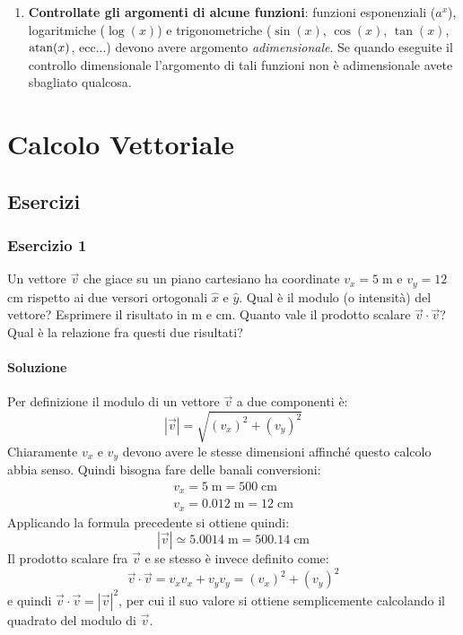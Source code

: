 \documentclass[12pt,a4paper]{book}
\begin{document}
\begin{enumerate}
\item \textbf{Controllate gli argomenti di alcune funzioni}: funzioni esponenziali ($a^x$), logaritmiche ($\log(x)$) e trigonometriche ($\sin(x)$, $\cos(x)$, $\tan(x)$, $\atan(x)$, ecc...) devono avere argomento \textit{adimensionale}. Se quando eseguite il controllo dimensionale l'argomento di tali funzioni non è adimensionale avete sbagliato qualcosa.
\end{enumerate}

\tableofcontents
\thispagestyle{empty}
\newpage

\mainmatter

\chapter{Calcolo Vettoriale}
\section{Esercizi}
\subsection*{Esercizio 1}
Un vettore $\vec{v}$ che giace su un piano cartesiano ha 
coordinate $v_x=5 \;$m e $v_y=12 \;$cm rispetto ai due versori ortogonali $\hat{x}$ e $\hat{y}$. Qual è il modulo (o intensità) del vettore? Esprimere il risultato in m e cm. Quanto vale il prodotto scalare $\vec{v} \cdot \vec{v}$? Qual è la relazione fra questi due risultati?
\subsubsection*{Soluzione}
Per definizione il modulo di un vettore $\vec{v}$ a due componenti è:
\begin{equation*}
|\vec{v}|=\sqrt{(v_x)^2+(v_y)^2}
\end{equation*}
Chiaramente $v_x$ e $v_y$ devono avere le stesse dimensioni 
affinché questo calcolo abbia senso. Quindi bisogna fare delle banali conversioni:
\begin{gather*}
v_x=5 \; \text{m}= 500 \; \text{cm}\\
v_x=0.012 \; \text{m}= 12 \; \text{cm}
\end{gather*}
Applicando la formula precedente si ottiene quindi:
\begin{equation*}
|\vec{v}|\simeq 5.0014 \; \text{m} =  500.14 \; \text{cm}
\end{equation*}
Il prodotto scalare fra $\vec{v}$ e se stesso è invece definito come:
\begin{equation*}
\vec{v} \cdot \vec{v}=v_x v_x + v_y v_y=(v_x)^2 + (v_y)^2 
\end{equation*}
e quindi $\vec{v} \cdot \vec{v}=|\vec{v}|^2$, per cui il suo valore si ottiene semplicemente calcolando il quadrato del modulo di $\vec{v}$.
\end{document}
